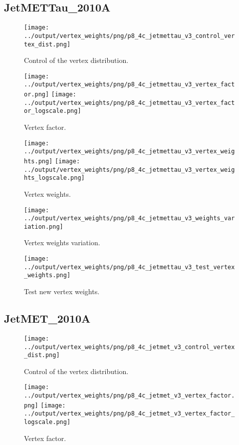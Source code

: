 \documentclass[11pt]{book}
\begin{document}
\subsection{JetMETTau\_2010A}
\begin{figure}[ht]
\centering
\texttt{[image: ../output/vertex\_weights/png/p8\_4c\_jetmettau\_v3\_control\_vertex\_dist.png]}
\caption{Control of the vertex distribution.}
\end{figure}

\begin{figure}[ht]
\centering
\texttt{[image: ../output/vertex\_weights/png/p8\_4c\_jetmettau\_v3\_vertex\_factor.png]}
\texttt{[image: ../output/vertex\_weights/png/p8\_4c\_jetmettau\_v3\_vertex\_factor\_logscale.png]}
\caption{Vertex factor.}
\end{figure}

\begin{figure}[ht]
\centering
\texttt{[image: ../output/vertex\_weights/png/p8\_4c\_jetmettau\_v3\_vertex\_weights.png]}
\texttt{[image: ../output/vertex\_weights/png/p8\_4c\_jetmettau\_v3\_vertex\_weights\_logscale.png]}
\caption{Vertex weights.}
\end{figure}

\begin{figure}[ht]
\centering
\texttt{[image: ../output/vertex\_weights/png/p8\_4c\_jetmettau\_v3\_weights\_variation.png]}
\caption{Vertex weights variation.}
\end{figure}

\begin{figure}[ht]
\centering
\texttt{[image: ../output/vertex\_weights/png/p8\_4c\_jetmettau\_v3\_test\_vertex\_weights.png]}
\caption{Test new vertex weights.}
\end{figure}
\clearpage

\subsection{JetMET\_2010A}
\begin{figure}[ht]
\centering
\texttt{[image: ../output/vertex\_weights/png/p8\_4c\_jetmet\_v3\_control\_vertex\_dist.png]}
\caption{Control of the vertex distribution.}
\end{figure}

\begin{figure}[ht]
\centering
\texttt{[image: ../output/vertex\_weights/png/p8\_4c\_jetmet\_v3\_vertex\_factor.png]}
\texttt{[image: ../output/vertex\_weights/png/p8\_4c\_jetmet\_v3\_vertex\_factor\_logscale.png]}
\caption{Vertex factor.}
\end{figure}
\end{document}
